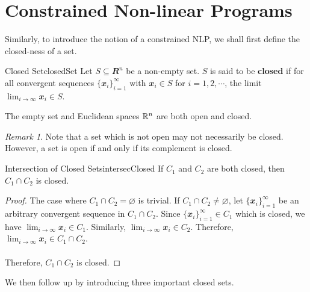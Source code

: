 \documentclass[math]{amznotes}
\theoremstyle{remark}
\newtheorem*{remark}{Remark}
\begin{document}
\section{Constrained Non-linear Programs}
Similarly, to introduce the notion of a constrained NLP, we shall first define the closed-ness of a set.
\begin{dfnbox}{Closed Set}{closedSet}
    Let $S \subseteq \mathbfit{R}^n$ be a non-empty set. $S$ is said to be {\color{red} \textbf{closed}} if for all convergent sequences $\{\mathbfit{x}_i\}_{i = 1}^{\infty}$ with $\mathbfit{x}_i \in S$ for $i = 1, 2, \cdots$, the limit $\lim_{i \to \infty} \mathbfit{x}_i \in S$.
\end{dfnbox}
The empty set and Euclidean spaces $\mathbb{R}^n$ are both open and closed.
\begin{notebox}
    \begin{remark}
        Note that a set which is not open may not necessarily be closed. However, a set is open if and only if its complement is closed.
    \end{remark}
\end{notebox}
\begin{thmbox}{Intersection of Closed Sets}{intersecClosed}
    If $C_1$ and $C_2$ are both closed, then $C_1 \cap C_2$ is closed.
    \tcblower
    \begin{proof}
        The case where $C_1 \cap C_2 = \varnothing$ is trivial. If $C_1 \cap C_2 \neq \varnothing$, let $\{\mathbfit{x}_i\}_{i = 1}^{\infty}$ be an arbitrary convergent sequence in $C_1 \cap C_2$. Since $\{\mathbfit{x}_i\}_{i = 1}^{\infty} \in C_1$ which is closed, we have $\lim_{i \to \infty} \mathbfit{x}_i \in C_1$. Similarly, $\lim_{i \to \infty} \mathbfit{x}_i \in C_2$. Therefore, $\lim_{i \to \infty} \mathbfit{x}_i \in C_1 \cap C_2$.
        \\\\
        Therefore, $C_1 \cap C_2$ is closed.
    \end{proof}
\end{thmbox}
We then follow up by introducing three important closed sets.
\end{document}
